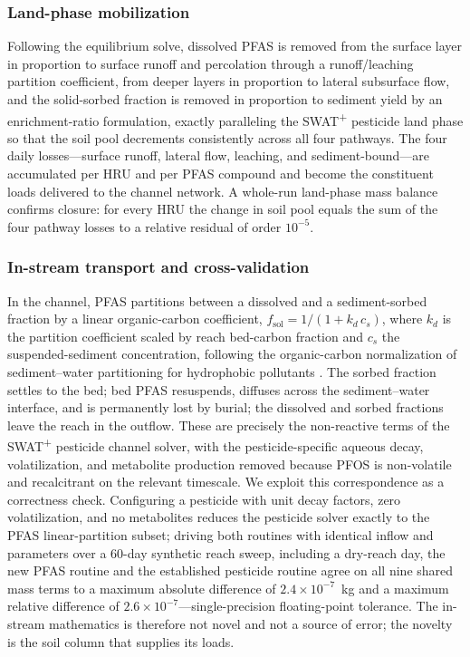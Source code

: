 \subsubsection{Land-phase mobilization}
Following the equilibrium solve, dissolved PFAS is removed from the surface layer in proportion to surface runoff and percolation through a runoff/leaching partition coefficient, from deeper layers in proportion to lateral subsurface flow, and the solid-sorbed fraction is removed in proportion to sediment yield by an enrichment-ratio formulation, exactly paralleling the SWAT\textsuperscript{+} pesticide land phase so that the soil pool decrements consistently across all four pathways. The four daily losses---surface runoff, lateral flow, leaching, and sediment-bound---are accumulated per HRU and per PFAS compound and become the constituent loads delivered to the channel network. A whole-run land-phase mass balance confirms closure: for every HRU the change in soil pool equals the sum of the four pathway losses to a relative residual of order $10^{-5}$.

\subsubsection{In-stream transport and cross-validation}
In the channel, PFAS partitions between a dissolved and a sediment-sorbed fraction by a linear organic-carbon coefficient, $f_{\text{sol}}=1/(1+k_d\,c_s)$, where $k_d$ is the partition coefficient scaled by reach bed-carbon fraction and $c_s$ the suspended-sediment concentration, following the organic-carbon normalization of sediment--water partitioning for hydrophobic pollutants \citep{karickhoff1979,chapra1997}. The sorbed fraction settles to the bed; bed PFAS resuspends, diffuses across the sediment--water interface, and is permanently lost by burial; the dissolved and sorbed fractions leave the reach in the outflow. These are precisely the non-reactive terms of the SWAT\textsuperscript{+} pesticide channel solver, with the pesticide-specific aqueous decay, volatilization, and metabolite production removed because PFOS is non-volatile and recalcitrant on the relevant timescale. We exploit this correspondence as a correctness check. Configuring a pesticide with unit decay factors, zero volatilization, and no metabolites reduces the pesticide solver exactly to the PFAS linear-partition subset; driving both routines with identical inflow and parameters over a 60-day synthetic reach sweep, including a dry-reach day, the new PFAS routine and the established pesticide routine agree on all nine shared mass terms to a maximum absolute difference of $2.4\times10^{-7}$~kg and a maximum relative difference of $2.6\times10^{-7}$---single-precision floating-point tolerance. The in-stream mathematics is therefore not novel and not a source of error; the novelty is the soil column that supplies its loads.

